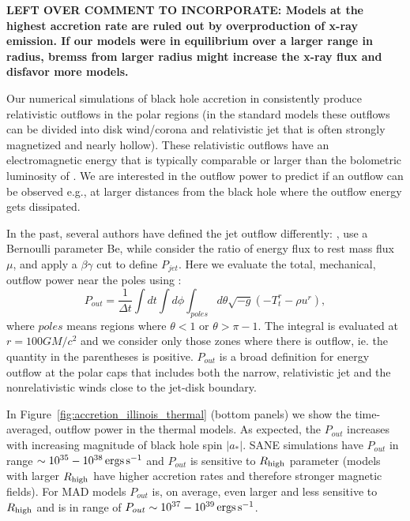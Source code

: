 \color{red}
{\bf LEFT OVER COMMENT TO INCORPORATE: Models at the highest accretion rate are ruled out by overproduction of x-ray emission.  If our models were in equilibrium over a larger range in radius, bremss from larger radius might increase the x-ray flux and disfavor more models.}
\color{black}

Our numerical simulations of black hole accretion in \sgra consistently produce relativistic outflows in the polar regions (in the standard models these outflows can be divided into disk wind/corona and relativistic jet that is often strongly magnetized and nearly hollow). These relativistic outflows have an electromagnetic energy that is typically comparable or larger than the bolometric luminosity of \sgra. We are interested in the outflow power to predict if an outflow can be observed e.g., at larger distances from the black hole where the outflow energy gets dissipated.

In the past, several authors have defined the jet outflow differently: \citet{refId0}, \citet{2014A&A...570A...7M} use a Bernoulli parameter Be, while \citealt{10.1111/j.1365-2966.2012.22002.x} consider the ratio of energy flux to rest mass flux $\mu$, and  apply a $\beta\gamma$ cut to define $P_{jet}$. Here we evaluate the total, mechanical, outflow power near the poles using :
\begin{equation}
    P_{out} = \frac{1}{\Delta t}\int dt \int d\phi  \int_{poles}d\theta \sqrt{-g}\left(-T^{r}_{t}-\rho u^{r}\right),
\end{equation}
where $poles$ means regions where $\theta<1$ or $\theta>\pi-1$. The integral is evaluated at $r=100GM/c^{2}$ and we consider only those zones where there is outflow, ie. the quantity in the parentheses is positive. $P_{out}$ is a broad definition for energy outflow at the polar caps that includes both the narrow, relativistic jet and the nonrelativistic winds close to the jet-disk boundary.

In Figure~\ref{fig:accretion_illinois_thermal}
(bottom panels) we show
the time-averaged, outflow power in the \kharma thermal models. As expected, the $P_{out}$ increases with increasing magnitude of black hole spin $|a_{*}|$. SANE simulations have $P_{out}$ in range $\sim 10^{35}-10^{38} \,\mathrm{ergs\,s^{-1}}$ and $P_{out}$ is sensitive to $R_\mathrm{high}$ parameter (models with larger $R_\mathrm{high}$ have higher accretion rates and therefore stronger magnetic fields). For MAD models $P_{out}$ is, on average, even larger and less sensitive to $R_\mathrm{high}$ and is in range of $P_{out} \sim 10^{37}-10^{39} \,\mathrm{ergs\,s^{-1}}$. 
\color{red}{\bf please add results from bhac for comparison if they are available.}\color{black}
\color{red}{\bf one should say a few words how electron distribution function changes mass accretion rate estimates and jet powers.}\color{black}

